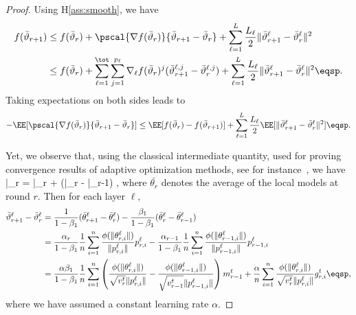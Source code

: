 \documentclass[manuscript,screen,review]{acmart}
\begin{document}
\begin{proof}
Using H\ref{ass:smooth}, we have
\begin{align}\notag
f(\bar{\vartheta}_{r+1}) &  \leq f(\bar{\vartheta}_r) + \pscal{\nabla f(\bar{\vartheta}_r)}{\bar{\vartheta}_{r+1} - \bar{\vartheta}_r} + \sum_{\ell =1}^L \frac{L_\ell}{2} \| \bar{\vartheta}^\ell_{r+1} - \bar{\vartheta}^\ell_r \|^2\\\notag
&  \leq f(\bar{\vartheta}_r) + \sum_{\ell=1}^\tot \sum_{j=1}^{p_\ell} \nabla_{\ell} f(\bar{\vartheta}_r)^j (\bar{\vartheta}^{\ell,j}_{r+1} - \bar{\vartheta}^{\ell,j}_r) + \sum_{\ell =1}^L \frac{L_\ell}{2} \| \bar{\vartheta}^\ell_{r+1} - \bar{\vartheta}^\ell_r \|^2  \eqsp.
\end{align}
Taking expectations on both sides leads to
\begin{align}\label{eq:main}
- \EE[  \pscal{\nabla f(\bar{\vartheta}_r)}{\bar{\vartheta}_{r+1} - \bar{\vartheta}_r}]  \leq  \EE[ f(\bar{\vartheta}_r) - f(\bar{\vartheta}_{r+1})] + \sum_{\ell =1}^L \frac{L_\ell}{2} \EE[  \| \bar{\vartheta}^\ell_{r+1} - \bar{\vartheta}^\ell_r \|^2] \eqsp.
\end{align}

Yet, we observe that, using the classical intermediate quantity, used for proving convergence results of adaptive optimization methods, see for instance~\citet{reddi2019convergence}, we have
\beq\label{eq:defseq}
\bar{\vartheta}_r = \bar{\theta}_r +  (\bar{\theta}_{r} - \bar{\theta}_{r-1}) \eqsp,
\eeq
where $\bar{\theta_r}$ denotes the average of the local models at round $r$.
Then for each layer $\ell$,
\begin{align}\label{eq:gap}
\bar{\vartheta}^\ell_{r+1} - \bar{\vartheta}^\ell_r  & = \frac{1}{1-\beta_1}(\bar{\theta}^\ell_{r+1} - \bar{\theta}^\ell_{r}) - \frac{\beta_1}{1-\beta_1}(\bar{\theta}^\ell_{r} - \bar{\theta}^\ell_{r-1}) \nonumber\\
& = \frac{\alpha_{r}}{1-\beta_1} \frac{1}{n} \sum_{i = 1}^n \frac{\phi(\|\theta_{r,i}^{\ell}\|)}{\|p_{r,i}^{\ell}\|} p_{r,i}^{\ell}  - \frac{\alpha_{r-1}}{1-\beta_1} \frac{1}{n} \sum_{i = 1}^n \frac{\phi(\|\theta_{r-1,i}^{\ell}\|)}{\|p_{r-1,i}^{\ell}\|} p_{r-1,i}^{\ell}\nonumber\\
& = \frac{\alpha \beta_1}{1-\beta_1} \frac{1}{n}  \sum_{i = 1}^n  \left( \frac{\phi(\|\theta_{r,i}^{\ell}\|)}{\sqrt{v^{t}_{r}} \|p_{r,i}^{\ell}\|} - \frac{\phi(\|\theta_{r-1,i}^{\ell}\|)}{\sqrt{v^{t}_{r-1}} \|p_{r-1,i}^{\ell}\|} \right) m^{t}_{r-1} + \frac{\alpha}{n} \sum_{i = 1}^n \frac{\phi(\|\theta_{r,i}^{\ell}\|)}{\sqrt{v^{t}_{r}} \|p_{r,i}^{\ell}\|} g^t_{r,i} \eqsp,
\end{align}
where we have assumed a constant learning rate $\alpha$.



\end{proof}
\end{document}

